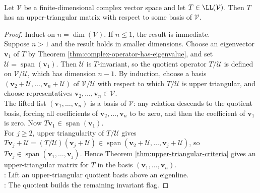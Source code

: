 \begin{theorem} \label{thm:complex-upper-triangularization} \\
Let $\mathcal{V}$ be a finite-dimensional complex vector space and let $T\in\LL(\mathcal{V})$. Then $T$ has an upper-triangular matrix with respect to some basis of $\mathcal{V}$.
\begin{proof} Induct on $n=\dim(\mathcal{V})$. If $n\leq1$, the result is immediate.\\
Suppose $n>1$ and the result holds in smaller dimensions. Choose an eigenvector $\mathbf{v}_1$ of $T$ by Theorem \ref{thm:complex-operator-has-eigenvalue}, and set $\mathcal{U}=\operatorname{span}(\mathbf{v}_1)$. Then $\mathcal{U}$ is $T$-invariant, so the quotient operator $T/\mathcal{U}$ is defined on $\mathcal{V}/\mathcal{U}$, which has dimension $n-1$. By induction, choose a basis $(\mathbf{v}_2+\mathcal{U},\ldots,\mathbf{v}_n+\mathcal{U})$ of $\mathcal{V}/\mathcal{U}$ with respect to which $T/\mathcal{U}$ is upper triangular, and choose representatives $\mathbf{v}_2,\ldots,\mathbf{v}_n\in\mathcal{V}$.\\
The lifted list $(\mathbf{v}_1,\ldots,\mathbf{v}_n)$ is a basis of $\mathcal{V}$: any relation descends to the quotient basis, forcing all coefficients of $\mathbf{v}_2,\ldots,\mathbf{v}_n$ to be zero, and then the coefficient of $\mathbf{v}_1$ is zero. Now $T\mathbf{v}_1\in\operatorname{span}(\mathbf{v}_1)$.\\
For $j\geq2$, upper triangularity of $T/\mathcal{U}$ gives $T\mathbf{v}_j+\mathcal{U} =(T/\mathcal{U})(\mathbf{v}_j+\mathcal{U}) \in\operatorname{span}(\mathbf{v}_2+\mathcal{U},\ldots,\mathbf{v}_j+\mathcal{U})$, so $T\mathbf{v}_j\in\operatorname{span}(\mathbf{v}_1,\ldots,\mathbf{v}_j)$. Hence Theorem \ref{thm:upper-triangular-criteria} gives an upper-triangular matrix for $T$ in the basis $(\mathbf{v}_1,\ldots,\mathbf{v}_n)$.\\
: Lift an upper-triangular quotient basis above an eigenline.\\
: The quotient builds the remaining invariant flag.
\end{proof}
\end{theorem}

